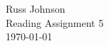 \documentclass[11pt,a4paper]{article}
\begin{document}
\begin{flushright}
Russ Johnson\\
Reading Assignment 5\\
\today\\
\end{flushright}
~
\end{document}
